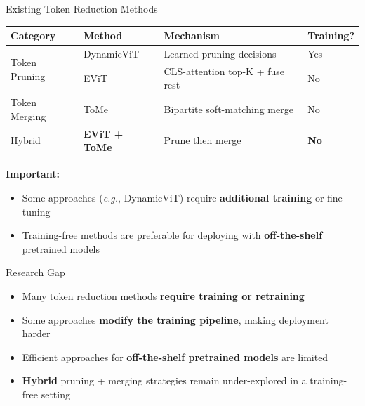 \documentclass[aspectratio=169, 11pt]{beamer}
\begin{document}
\begin{frame}{Existing Token Reduction Methods}
\begin{table}[h]
\centering
\small
\begin{tabular}{@{}llll@{}}
\toprule
\textbf{Category} & \textbf{Method} & \textbf{Mechanism} & \textbf{Training?} \\
\midrule
\multirow{2}{*}{Token Pruning}
  & DynamicViT & Learned pruning decisions     & Yes \\
  & EViT       & CLS-attention top-K + fuse rest & No  \\
\midrule
\multirow{1}{*}{Token Merging}
  & ToMe       & Bipartite soft-matching merge  & No  \\
\midrule
\multirow{1}{*}{Hybrid}
  & \textbf{EViT + ToMe} & Prune then merge      & \textbf{No}  \\
\bottomrule
\end{tabular}
\end{table}

\vspace{0.3cm}
\textbf{Important:}
\begin{itemize}
  \item Some approaches (\textit{e.g.}, DynamicViT) require \textbf{additional training} or fine-tuning
  \item Training-free methods are preferable for deploying with \textbf{off-the-shelf} pretrained models
\end{itemize}
\end{frame}

\begin{frame}{Research Gap}
\begin{itemize}
  \item Many token reduction methods \textbf{require training or retraining}
  \item Some approaches \textbf{modify the training pipeline}, making deployment harder
  \item Efficient approaches for \textbf{off-the-shelf pretrained models} are limited
  \item \textbf{Hybrid} pruning + merging strategies remain under-explored in a training-free setting
\end{itemize}

\vspace{0.6cm}
\begin{center}
\end{center}
\end{frame}
\end{document}
